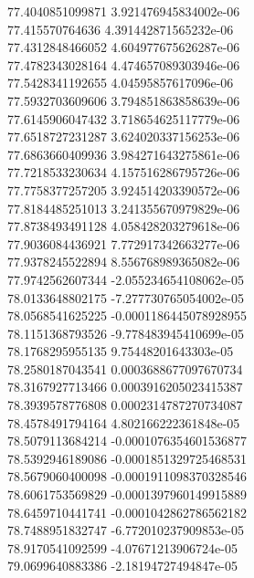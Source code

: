 {77.4040851099871 3.921476945834002e-06 \\
77.415570764636 4.391442871565232e-06 \\
77.4312848466052 4.604977675626287e-06 \\
77.4782343028164 4.474657089303946e-06 \\
77.5428341192655 4.04595857617096e-06 \\
77.5932703609606 3.794851863858639e-06 \\
77.6145906047432 3.718654625117779e-06 \\
77.6518727231287 3.624020337156253e-06 \\
77.6863660409936 3.984271643275861e-06 \\
77.7218533230634 4.157516286795726e-06 \\
77.7758377257205 3.924514203390572e-06 \\
77.8184485251013 3.241355670979829e-06 \\
77.8738493491128 4.058428203279618e-06 \\
77.9036084436921 7.772917342663277e-06 \\
77.9378245522894 8.556768989365082e-06 \\
77.9742562607344 -2.055234654108062e-05 \\
78.0133648802175 -7.277730765054002e-05 \\
78.0568541625225 -0.0001186445078928955 \\
78.1151368793526 -9.778483945410699e-05 \\
78.1768295955135 9.75448201643303e-05 \\
78.2580187043541 0.0003688677097670734 \\
78.3167927713466 0.0003916205023415387 \\
78.3939578776808 0.0002314787270734087 \\
78.4578491794164 4.802166222361848e-05 \\
78.5079113684214 -0.0001076354601536877 \\
78.5392946189086 -0.0001851329725468531 \\
78.5679060400098 -0.0001911098370328546 \\
78.6061753569829 -0.0001397960149915889 \\
78.6459710441741 -0.0001042862786562182 \\
78.7488951832747 -6.772010237909853e-05 \\
78.9170541092599 -4.07671213906724e-05 \\
79.0699640883386 -2.18194727494847e-05 \\
}
